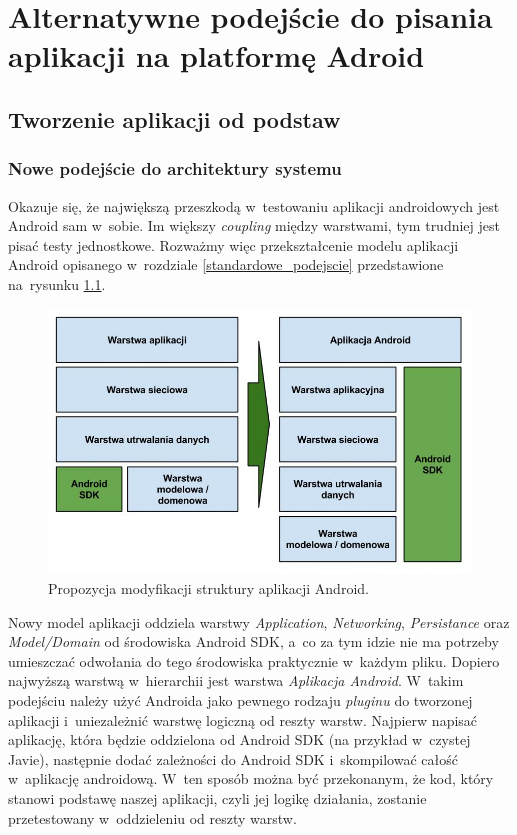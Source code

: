 \chapter{Alternatywne podejście do pisania aplikacji na platformę Adroid}
\label{propozycja_rozwiazania}

\section{Tworzenie aplikacji od podstaw}
\label{nowa_aplikacja}
\subsection{Nowe podejście do architektury systemu}
\label{clean_architecture}
Okazuje się, że największą przeszkodą w~testowaniu aplikacji androidowych jest Android sam w~sobie. Im większy \textit{coupling} między warstwami, tym trudniej jest pisać testy jednostkowe. Rozważmy więc przekształcenie modelu aplikacji Android opisanego w~rozdziale \ref{standardowe_podejscie} przedstawione na~rysunku \ref{fig:opis_rozwiazania}.

\begin{figure}[!htb]
    \centering
    \includegraphics[width=13cm]{imgs/ch4_opis_rozwiazania_1_pl.jpg}
    \caption
{Propozycja modyfikacji struktury aplikacji Android.}
    \label{fig:opis_rozwiazania}
\end{figure} 

Nowy model aplikacji oddziela warstwy \textit{Application}, \textit{Networking}, \textit{Persistance} oraz \textit{Model/Domain} od środowiska Android SDK, a~co za tym idzie nie ma potrzeby umieszczać odwołania do tego środowiska praktycznie w~każdym pliku. Dopiero najwyższą warstwą w~hierarchii jest warstwa \textit{Aplikacja Android}. W~takim podejściu należy użyć Androida jako pewnego rodzaju \textit{pluginu} do tworzonej aplikacji i~uniezależnić warstwę logiczną od reszty warstw. Najpierw napisać aplikację, która będzie oddzielona od Android SDK (na przykład w~czystej Javie), następnie dodać zależności do Android SDK i~skompilować całość w~aplikację androidową. W~ten sposób można być przekonanym, że kod, który stanowi podstawę naszej aplikacji, czyli jej logikę działania, zostanie przetestowany w~oddzieleniu od reszty warstw.

